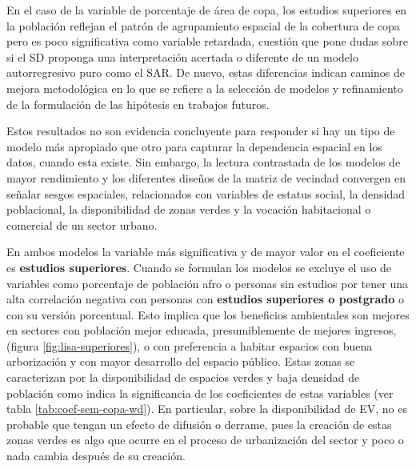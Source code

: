 \documentclass[12pt,a4paper,openany]{book}
\theoremstyle{definition}
\theoremstyle{definition}
\theoremstyle{definition}
\theoremstyle{remark}
\begin{document}
En el caso de la variable de porcentaje de área de copa, los estudios
superiores en la población reflejan el patrón de agrupamiento espacial
de la cobertura de copa pero es poco significativa como variable
retardada, cuestión que pone dudas sobre si el SD proponga una
interpretación acertada o diferente de un modelo autorregresivo puro
como el SAR. De nuevo, estas diferencias indican caminos de mejora
metodológica en lo que se refiere a la selección de modelos y
refinamiento de la formulación de las hipótesis en trabajos futuros.

Estos resultados no son evidencia concluyente para responder si hay un
tipo de modelo más apropiado que otro para capturar la dependencia
espacial en los datos, cuando esta existe. Sin embargo, la lectura
contrastada de los modelos de mayor rendimiento y los diferentes diseños
de la matriz de vecindad convergen en señalar sesgos espaciales,
relacionados con variables de estatus social, la densidad poblacional,
la disponibilidad de zonas verdes y la vocación habitacional o comercial
de un sector urbano.

En ambos modelos la variable más significativa y de mayor valor en el
coeficiente es \textbf{estudios superiores}. Cuando se formulan los
modelos se excluye el uso de variables como porcentaje de población afro
o personas sin estudios por tener una alta correlación negativa con
personas con \textbf{estudios superiores o postgrado} o con su versión
porcentual. Esto implica que los beneficios ambientales son mejores en
sectores con población mejor educada, presumiblemente de mejores
ingresos, (figura \ref{fig:lisa-superiores}), o con preferencia a
habitar espacios con buena arborización y con mayor desarrollo del
espacio público. Estas zonas se caracterizan por la disponibilidad de
espacios verdes y baja densidad de población como indica la
significancia de los coeficientes de estas variables (ver tabla
\ref{tab:coef-sem-copa-wd}). En particular, sobre la disponibilidad de
EV, no es probable que tengan un efecto de difusión o derrame, pues la
creación de estas zonas verdes es algo que ocurre en el proceso de
urbanización del sector y poco o nada cambia después de su creación.
\end{document}
